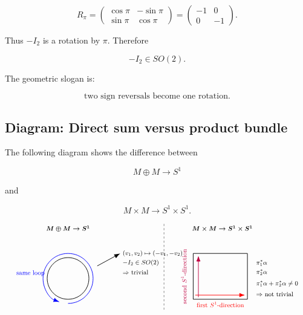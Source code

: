 \documentclass[12pt,a4paper]{article}
\theoremstyle{notespace}
\begin{document}
	\[
	R_{\pi}
	=
	\begin{pmatrix}
		\cos\pi&-\sin\pi\\
		\sin\pi&\cos\pi
	\end{pmatrix}
	=
	\begin{pmatrix}
		-1&0\\
		0&-1
	\end{pmatrix}.
	\]
	
	Thus \(-I_{2}\) is a rotation by \(\pi\). Therefore
	
	\[
	-I_{2}\in SO(2).
	\]
	
	The geometric slogan is:
	
	\[
	\boxed{
		\text{two sign reversals become one rotation.}
	}
	\]
	
	\subsection{Diagram: Direct sum versus product bundle}
	
	The following diagram shows the difference between
	
	\[
	M\oplus M\to S^{1}
	\]
	
	and
	
	\[
	M\times M\to S^{1}\times S^{1}.
	\]
	
	\[
	\resizebox{\textwidth}{!}{
		\begin{tikzpicture}[scale=1.05, every node/.style={font=\small}]
			
			\node at (0,2.4) {\(\boldsymbol{M\oplus M\to S^{1}}\)};
			\draw[thick] (0,0) circle (1);
			\draw[-{Latex[length=3mm]}, thick, blue] (0,-1.2) arc (-90:250:1.2);
			\node[blue] at (-1.8,0.25) {same loop};
			
			\draw[-{Latex[length=3mm]}, thick] (1.4,0.6) -- (2.5,1.2);
			\node[right] at (2.5,1.2) {\((v_1,v_2)\mapsto(-v_1,-v_2)\)};
			\node[right] at (2.5,0.75) {\(-I_2\in SO(2)\)};
			\node[right] at (2.5,0.3) {\(\Rightarrow\) trivial};
			
			\draw[dashed] (4.6,-1.5) -- (4.6,2.7);
			
			\node at (7.4,2.4) {\(\boldsymbol{M\times M\to S^{1}\times S^{1}}\)};
			
			\draw[thick] (6,-1) rectangle (8.6,1.2);
			\draw[-{Latex[length=3mm]}, thick, red] (6.1,-0.8) -- (8.5,-0.8);
			\node[red] at (7.3,-1.25) {first \(S^1\)-direction};
			
			\draw[-{Latex[length=3mm]}, thick, purple] (6.25,-0.9) -- (6.25,1.1);
			\node[purple, rotate=90] at (5.55,0.1) {second \(S^1\)-direction};
			
			\node[right] at (8.9,0.75) {\(\pi_1^\ast\alpha\)};
			\node[right] at (8.9,0.3) {\(\pi_2^\ast\alpha\)};
			\node[right] at (8.9,-0.25) {\(\pi_1^\ast\alpha+\pi_2^\ast\alpha\neq 0\)};
			\node[right] at (8.9,-0.75) {\(\Rightarrow\) not trivial};
			
		\end{tikzpicture}
	}
	\]
	
\end{document}
